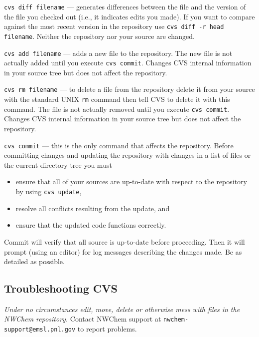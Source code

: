 \begin{description}
\item{\texttt{cvs diff filename}} --- generates differences between the
  file and the version of the file you checked out (i.e., it indicates
  edits you made).  If you want to compare against the most recent
  version in the repository use \texttt{cvs diff -r head filename}.
  Neither the repository nor your source are changed.

\item{\texttt{cvs add filename}} --- adds a new file to the repository.
  The new file is not actually added until you execute \texttt{cvs
 commit}.  Changes CVS internal information in your source tree but
  does not affect the repository.

\item{\texttt{cvs rm filename}} --- to delete a file from the repository
  delete it from your source with the standard UNIX \texttt{rm} command
  then tell CVS to delete it with this command.  The file
  is not actually removed until you execute \texttt{cvs commit}.  Changes CVS
  internal information in your source tree but does not affect the
  repository.
  
\item{\texttt{cvs commit}} --- this is the only command that affects the
  repository.  Before committing changes and updating the repository
  with changes in a list of files or the current directory tree you
  must
  \begin{itemize}
  \item ensure that all of your sources are up-to-date with respect to
    the repository by using \texttt{cvs update},
  \item resolve all conflicts resulting from the update, and
  \item ensure that the updated code functions correctly.
  \end{itemize}
  Commit will verify that all source is up-to-date before proceeding.
  Then it will prompt (using an editor) for log messages describing
  the changes made.  Be as detailed as possible.
\end{description}

\subsection{Troubleshooting CVS}

{\em Under no circumstances edit, move, delete or otherwise mess with
  files in the NWChem repository.}
  Contact NWChem support at {\tt nwchem-support@emsl.pnl.gov}
  to report problems.


